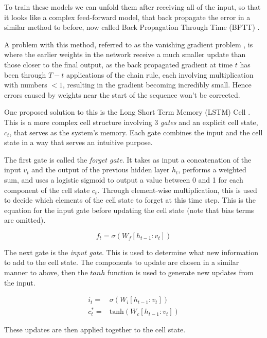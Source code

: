 \documentclass[bsc,singlespacing,logo, parskip, deptreport]{infthesis}
\begin{document}
To train these models we can unfold them after receiving all of the input, so that it looks like a complex feed-forward model, that back propagate the error in a similar method to before, now called Back Propagation Through Time (BPTT) \cite{werbos1990backpropagation}.

A problem with this method, referred to as the vanishing gradient problem \cite{hochreiter1998vanishing}, is where the earlier weights in the network receive a much smaller update than those closer to the final output, as the back propagated gradient at time $t$ has been through $T - t$ applications of the chain rule, each involving multiplication with numbers $< 1$, resulting in the gradient becoming incredibly small. Hence errors caused by weights near the start of the sequence won't be corrected.

One proposed solution to this is the Long Short Term Memory (LSTM) Cell \cite{hochreiter1997long}. This is a more complex cell structure involving 3 {\em gates} and an explicit cell state, $c_t$, that serves as the system's memory. Each gate combines the input and the cell state in a way that serves an intuitive purpose.

The first gate is called the {\em forget gate}. It takes as input a concatenation of the input $v_t$ and the output of the previous hidden layer $h_t$, performs a weighted sum, and uses a logistic sigmoid to output a value between 0 and 1 for each component of the cell state $c_t$. Through element-wise multiplication, this is used to decide which elements of the cell state to forget at this time step. This is the equation for the input gate before updating the cell state (note that bias terms are omitted).

\begin{equation}
  \label{forget gate}
  f_t = \sigma (W_f [h_{t-1} : v_t])
\end{equation}

The next gate is the {\em input gate}. This is used to determine what new information to add to the cell state. The components to update are chosen in a similar manner to above, then the $tanh$ function is used to generate new updates from the input.

\begin{align}
  \label{input gate}
  i_t =& \sigma (W_i [h_{t-1} : v_t]) \\
  c^*_t =& \mathrm{tanh} (W_c [h_{t-1} : v_t])
\end{align}

These updates are then applied together to the cell state.
\end{document}
